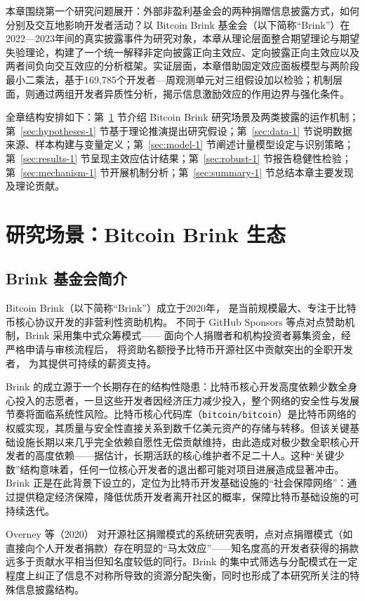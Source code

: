 \documentclass[
    type = master, %
    degree = professional,        %
    decl-page,  %
    twoside,                %
    fontset = fandol %
  ]{njuthesis}
\begin{document}
本章围绕第一个研究问题展开：外部非盈利基金会的两种捐赠信息披露方式，如何分别及交互地影响开发者活动？以 Bitcoin Brink 基金会（以下简称“Brink”）在2022—2023年间的真实披露事件为研究对象，本章从理论层面整合期望理论与期望失验理论，构建了一个统一解释非定向披露正向主效应、定向披露正向主效应以及两者间负向交互效应的分析框架。实证层面，本章借助固定效应面板模型与两阶段最小二乘法，基于169,785个开发者—周观测单元对三组假设加以检验；机制层面，则通过两组开发者异质性分析，揭示信息激励效应的作用边界与强化条件。

全章结构安排如下：第~\ref{sec:research-scene-1} 节介绍 Bitcoin Brink 研究场景及两类披露的运作机制；第~\ref{sec:hypotheses-1} 节基于理论推演提出研究假设；第~\ref{sec:data-1} 节说明数据来源、样本构建与变量定义；第~\ref{sec:model-1} 节阐述计量模型设定与识别策略；第~\ref{sec:results-1} 节呈现主效应估计结果；第~\ref{sec:robust-1} 节报告稳健性检验；第~\ref{sec:mechanism-1} 节开展机制分析；第~\ref{sec:summary-1} 节总结本章主要发现及理论贡献。

\section{研究场景：Bitcoin Brink 生态}
\label{sec:research-scene-1}

\subsection{Brink 基金会简介}

Bitcoin Brink（以下简称“Brink”）成立于2020年，
是当前规模最大、专注于比特币核心协议开发的非营利性资助机构。
不同于 GitHub Sponsors 等点对点赞助机制，Brink 采用集中式众筹模式——
面向个人捐赠者和机构投资者募集资金，经严格申请与审核流程后，
将资助名额授予比特币开源社区中贡献突出的全职开发者，
为其提供可持续的薪资支持。

Brink 的成立源于一个长期存在的结构性隐患：比特币核心开发高度依赖少数全身心投入的志愿者，一旦这些开发者因经济压力减少投入，整个网络的安全性与发展节奏将面临系统性风险。比特币核心代码库（\texttt{bitcoin/bitcoin}）是比特币网络的权威实现，其质量与安全性直接关系到数千亿美元资产的存储与转移。但该关键基础设施长期以来几乎完全依赖自愿性无偿贡献维持，由此造成对极少数全职核心开发者的高度依赖——据估计，长期活跃的核心维护者不足二十人。这种“关键少数”结构意味着，任何一位核心开发者的退出都可能对项目进展造成显著冲击。Brink 正是在此背景下设立的，定位为比特币开发基础设施的“社会保障网络”：通过提供稳定经济保障，降低优质开发者离开社区的概率，保障比特币基础设施的可持续迭代。

Overney 等（2020）\cite{overney2020not} 对开源社区捐赠模式的系统研究表明，点对点捐赠模式（如直接向个人开发者捐款）存在明显的“马太效应”——知名度高的开发者获得的捐款远多于贡献水平相当但知名度较低的同行。Brink 的集中式筛选与分配模式在一定程度上纠正了信息不对称所导致的资源分配失衡，同时也形成了本研究所关注的特殊信息披露结构。
\end{document}
